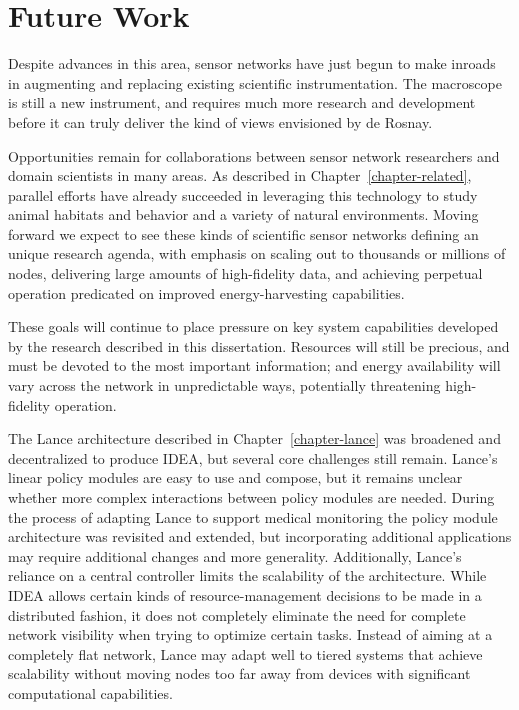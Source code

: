 \section{Future Work}

Despite advances in this area, sensor networks have just begun to make
inroads in augmenting and replacing existing scientific instrumentation. The
macroscope is still a new instrument, and requires much more research and
development before it can truly deliver the kind of views envisioned by de
Rosnay.

Opportunities remain for collaborations between sensor network researchers
and domain scientists in many areas. As described in
Chapter~\ref{chapter-related}, parallel efforts have already succeeded in
leveraging this technology to study animal habitats and behavior and a
variety of natural environments. Moving forward we expect to see these kinds
of scientific sensor networks defining an unique research agenda, with
emphasis on scaling out to thousands or millions of nodes, delivering large
amounts of high-fidelity data, and achieving perpetual operation predicated
on improved energy-harvesting capabilities.

These goals will continue to place pressure on key system capabilities
developed by the research described in this dissertation. Resources will
still be precious, and must be devoted to the most important information; and
energy availability will vary across the network in unpredictable ways,
potentially threatening high-fidelity operation.

The Lance architecture described in Chapter~\ref{chapter-lance} was broadened
and decentralized to produce IDEA, but several core challenges still remain.
Lance's linear policy modules are easy to use and compose, but it remains
unclear whether more complex interactions between policy modules are needed.
During the process of adapting Lance to support medical monitoring the policy
module architecture was revisited and extended, but incorporating additional
applications may require additional changes and more generality.
Additionally, Lance's reliance on a central controller limits the scalability
of the architecture. While IDEA allows certain kinds of resource-management
decisions to be made in a distributed fashion, it does not completely
eliminate the need for complete network visibility when trying to optimize
certain tasks. Instead of aiming at a completely flat network, Lance may
adapt well to tiered systems that achieve scalability without moving nodes
too far away from devices with significant computational capabilities.

